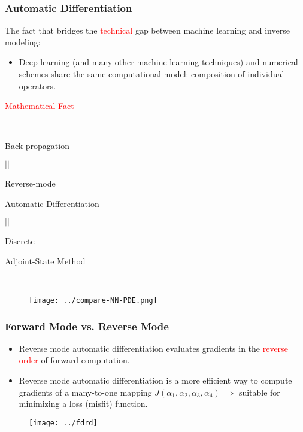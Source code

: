\documentclass[usenames,dvipsnames]{beamer}
\begin{document}
\begin{frame}
	\frametitle{Automatic Differentiation}
The fact that bridges the \textcolor{red}{technical} gap between machine learning and inverse modeling:
	\begin{itemize}
		\item Deep learning (and many other machine learning techniques) and numerical schemes share the same computational model: composition of individual operators. 
	\end{itemize}
	

\begin{minipage}[b]{0.4\textwidth}




\begin{center}
\textcolor{red}{Mathematical Fact}

\

	Back-propagation 

$||$

Reverse-mode

 Automatic Differentiation 

$||$
 
 Discrete 
 
 Adjoint-State Method
\end{center}
\end{minipage}~
\begin{minipage}[b]{0.6\textwidth}
\begin{figure}[hbt]
\centering
  \texttt{[image: ../compare-NN-PDE.png]}
\end{figure}
\end{minipage}

\end{frame}




\begin{frame}
	\frametitle{Forward Mode vs. Reverse Mode}
	
	\begin{itemize}
		\item Reverse mode automatic differentiation evaluates gradients in the \textcolor{red}{reverse order} of forward computation. 
		\item Reverse mode automatic differentiation is a more efficient way to compute gradients of a many-to-one mapping $J(\alpha_1, \alpha_2, \alpha_3,\alpha_4)$ $\Rightarrow$ suitable for minimizing a loss (misfit) function. 
	\end{itemize}
	
	\begin{figure}[hbt]
		\texttt{[image: ../fdrd]}
	\end{figure}
	
	
	
\end{frame}
\end{document}
